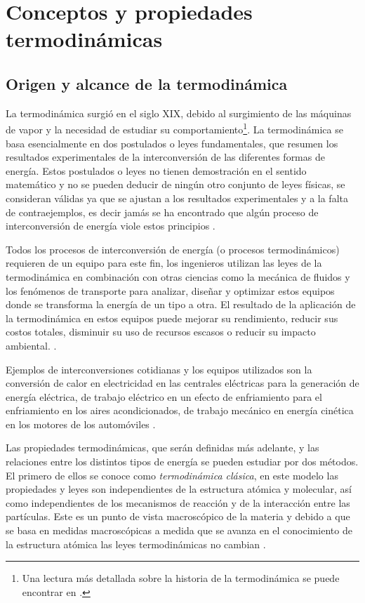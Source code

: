 \documentclass[../master.tex]{subfiles}
\begin{document}
\chapter{Conceptos y propiedades termodinámicas}

\section{Origen y alcance de la termodinámica}

La termodinámica surgió en el siglo XIX, debido al surgimiento de las máquinas de vapor y la necesidad de estudiar su comportamiento\footnote{Una lectura más detallada sobre la historia de la termodinámica se puede encontrar en \cite{clavell}.}. La termodinámica se basa esencialmente en dos postulados o leyes fundamentales, que resumen los resultados experimentales de la interconversión de las diferentes formas de energía. Estos postulados o leyes no tienen demostración en el sentido matemático y no se pueden deducir de ningún otro conjunto de leyes físicas, se consideran válidas ya que se ajustan a los resultados experimentales y a la falta de contraejemplos, es decir jamás se ha encontrado que algún proceso de interconversión de energía viole estos principios \parencites{glasstone}{smith-vanness}.

Todos los procesos de interconversión de energía (o procesos termodinámicos) requieren de un equipo para este fin, los ingenieros utilizan las leyes de la termodinámica en combinación con otras ciencias como la mecánica de fluidos y los fenómenos de transporte para analizar, diseñar y optimizar estos equipos donde se transforma la energía de un tipo a otra. El resultado de la aplicación de la termodinámica en estos equipos puede mejorar su rendimiento, reducir sus costos totales, disminuir su uso de recursos escasos o reducir su impacto ambiental. \parencites{wark}{moranshapiro}.

Ejemplos de interconversiones cotidianas y los equipos utilizados son la conversión de calor en electricidad en las centrales eléctricas para la generación de energía eléctrica, de trabajo eléctrico en un efecto de enfriamiento para el enfriamiento en los aires acondicionados, de trabajo mecánico en energía cinética en los motores de los automóviles \parencite{faires}.

Las propiedades termodinámicas, que serán definidas más adelante, y las relaciones entre los distintos tipos de energía se pueden estudiar por dos métodos. El primero de ellos se conoce como \emph{termodinámica clásica}, en este modelo las propiedades y leyes son independientes de la estructura atómica y molecular, así como independientes de los mecanismos de reacción y de la interacción entre las partículas. Este es un punto de vista macroscópico de la materia y debido a que se basa en medidas macroscópicas a medida que se avanza en el conocimiento de la estructura atómica las leyes termodinámicas no cambian \parencites{faires}{glasstone}{wark}.
\end{document}
